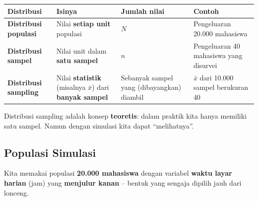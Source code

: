 \documentclass[
  indonesian,
  letterpaper,
]{book}
\newcounter{none} %
\begin{document}
{\def\LTcaptype{none} %
\begin{longtable}[]{@{}
  >{\raggedright\arraybackslash}p{}
  >{\raggedright\arraybackslash}p{}
  >{\raggedright\arraybackslash}p{}
  >{\raggedright\arraybackslash}p{}@{}}
\toprule\noalign{}
\begin{minipage}[b]{\linewidth}\raggedright
Distribusi
\end{minipage} & \begin{minipage}[b]{\linewidth}\raggedright
Isinya
\end{minipage} & \begin{minipage}[b]{\linewidth}\raggedright
Jumlah nilai
\end{minipage} & \begin{minipage}[b]{\linewidth}\raggedright
Contoh
\end{minipage} \\
\midrule\noalign{}
\endhead
\bottomrule\noalign{}
\endlastfoot
\textbf{Distribusi populasi} & Nilai \textbf{setiap unit} populasi &
\(N\) & Pengeluaran 20.000 mahasiswa \\
\textbf{Distribusi sampel} & Nilai unit dalam \textbf{satu sampel} &
\(n\) & Pengeluaran 40 mahasiswa yang disurvei \\
\textbf{Distribusi sampling} & Nilai \textbf{statistik} (misalnya
\(\bar{x}\)) dari \textbf{banyak sampel} & Sebanyak sampel yang
(dibayangkan) diambil & \(\bar{x}\) dari 10.000 sampel berukuran 40 \\
\end{longtable}
}

Distribusi sampling adalah konsep \textbf{teoretis}: dalam praktik kita
hanya memiliki satu sampel. Namun dengan simulasi kita dapat
``melihatnya''.

\subsection{Populasi Simulasi}\label{populasi-simulasi}

Kita memakai populasi \textbf{20.000 mahasiswa} dengan variabel
\textbf{waktu layar harian} (jam) yang \textbf{menjulur kanan} -- bentuk
yang sengaja dipilih jauh dari lonceng.
\end{document}
